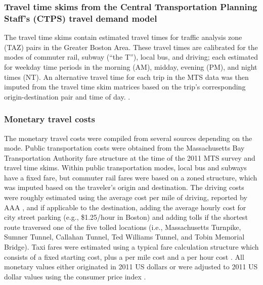 \documentclass[numbered]{trbunofficial}\usepackage[]{graphicx}\usepackage[]{color}
\begin{document}
\subsubsection{Travel time skims from the Central Transportation Planning Staff's (CTPS) travel demand model}
The travel time skims contain estimated travel times for  traffic analysis zone (TAZ) pairs in the Greater Boston Area. These travel times are calibrated for the modes of commuter rail, subway (``the T''), local bus, and driving; each estimated for weekday time periods in the morning (AM), midday, evening (PM), and night times (NT). An alternative travel time for each trip in the MTS data was then imputed from the travel time skim matrices based on the trip's corresponding origin-destination pair and time of day.
.

\subsubsection{Monetary travel costs}
The monetary travel costs were compiled from several sources depending on the mode. Public transportation costs were obtained from the Massachusetts Bay Transportation Authority fare structure at the time of the 2011 MTS survey and travel time skims. Within public transportation modes, local bus and subways have a fixed fare, but commuter rail fares were based on a zoned structure, which was imputed based on the traveler's origin and destination. The driving costs were roughly estimated using the average cost per mile of driving, reported by AAA \citep{AAA2018}, and if applicable to the destination, adding the average hourly cost for city street parking (e.g., \$1.25/hour in Boston) and adding tolls if the shortest route traversed one of the five tolled locations (i.e., Massachusetts Turnpike, Sumner Tunnel, Callahan Tunnel, Ted Williams Tunnel, and Tobin Memorial Bridge). Taxi fares were estimated using a typical fare calculation structure which consists of a fixed starting cost, plus a per mile cost and a per hour cost \citep{NUMBEO2019}. All monetary values either originated in 2011 US dollars or were adjusted to 2011 US dollar values using the consumer price index \citep{BLS2019}.
\end{document}
